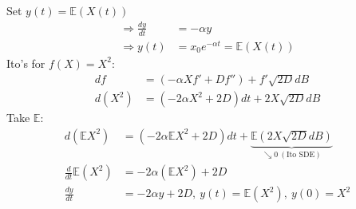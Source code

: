 \documentclass[12pt, letterpaper]{article}
\begin{document}
Set $y(t) = \mathbb{E}(X(t))$
\begin{align*}
    \Rightarrow \frac{dy}{dt} &= - \alpha y \\
    \Rightarrow y(t) &= x_0 e^{-\alpha t} = \mathbb{E}(X(t))
\end{align*}
Ito's for $f(X) = X^2$:  \\
\begin{align*}
    df &= (-\alpha Xf' + Df'')+f'\sqrt{2D}dB \\
    d(X^2) &= (-2\alpha X^2 + 2D)dt + 2X \sqrt{2D}dB
\end{align*}
Take $\mathbb{E}$:
\begin{align*}
    d(\mathbb{E}X^2) &= (-2\alpha\mathbb{E}X^2 + 2D)dt + \underbrace{\mathbb{E}(2X\sqrt{2D}dB)}_{\searrow 0\ (\text{Ito SDE})} \\
    \frac d{dt} \mathbb{E}(X^2) &= -2\alpha (\mathbb{E}X^2) + 2D \\
    \frac{dy}{dt} &= -2\alpha y + 2D,\ y(t) = \mathbb{E}(X^2),\ y(0) = X^2
\end{align*}
\end{document}
